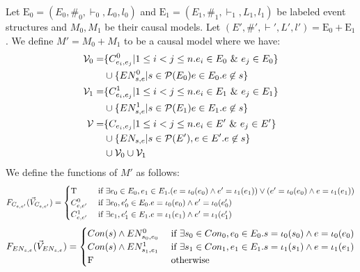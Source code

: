 \begin{definition}
    Let $\mathrm{E}_0 = (E_0,\#_0,\vdash_0,L_0,l_0)$ and
    $\mathrm{E}_1 = (E_1,\#_1,\vdash_1,L_1,l_1)$ be labeled event structures
    and $M_0,M_1$ be their causal models.
    Let $(E',\#',\vdash',L',l') = \mathrm{E_0} + \mathrm{E_1}$.
    We define $M' = M_0 + M_1$ to be a causal model where we have:
    \begin{align*}
        \mathcal{V}_0 = & \{C_{e_i,e_j}^0 |  1 \leq i < j \leq n.
        e_i \in E_0 \ \& \  e_j \in E_0\}                                 \\
                        & \cup \{EN_{s,e}^0 | s \in \mathcal{P}(E_0)
        e \in E_0. e \not \in s \}                                     \\
        \mathcal{V}_1 = & \{C_{e_i,e_j}^1 |  1 \leq i < j \leq n.
        e_i \in E_1 \ \& \  e_j \in E_1\}                                 \\
                        & \cup \{EN_{s,e}^1 | s \in \mathcal{P}(E_1)
        e \in E_1. e \not \in s \}                                     \\
        \mathcal{V} =   & \{C_{e_i,e_j} |  1 \leq i < j \leq n.
        e_i \in E' \ \& \  e_j \in E'\}                                   \\
                        & \cup \{EN_{s,e} | s \in \mathcal{P}(E'),
        e \in E'. e \not \in s \}                                      \\
                        & \cup \mathcal{V}_0 \cup \mathcal{V}_1
    \end{align*}
    We define the functions of $M'$ as follows:
    $$
        F_{C_{e,e'}}(\vec V_{C_{e,e'}}) = \begin{cases}
            \mathrm{T}         & \text{ if } \exists e_0 \in E_0,e_1 \in E_1.
            (e = \iota_0(e_0) \wedge e' = \iota_1(e_1))
            \vee (e' = \iota_0(e_0) \wedge e = \iota_1(e_1))                    \\
            C^0_{e,e'} & \text{ if } \exists e_0,e_0' \in E_0. e = \iota_0(e_0)
            \wedge e' = \iota_0(e_0')                                           \\
            C^1_{e,e'} & \text{ if } \exists e_1,e_1' \in E_1. e = \iota_1(e_1)
            \wedge e' = \iota_1(e_1')
        \end{cases}
    $$
    $$
        F_{EN_{s,e}}(\vec V_{EN_{s,e}}) = \begin{cases}
            Con(s) \wedge EN^0_{s_0,e_0} & \text{ if }
            \exists s_0 \in Con_0,e_0 \in E_0. s = \iota_0(s_0)
            \wedge e = \iota_0(e_0)                           \\
            Con(s) \wedge EN^1_{s_1,e_1} & \text{ if }
            \exists s_1 \in Con_1,e_1 \in E_1. s = \iota_1(s_1)
            \wedge e = \iota_1(e_1)                           \\
            \mathrm{F}                           & \text{ otherwise }
        \end{cases}
    $$
\end{definition}

